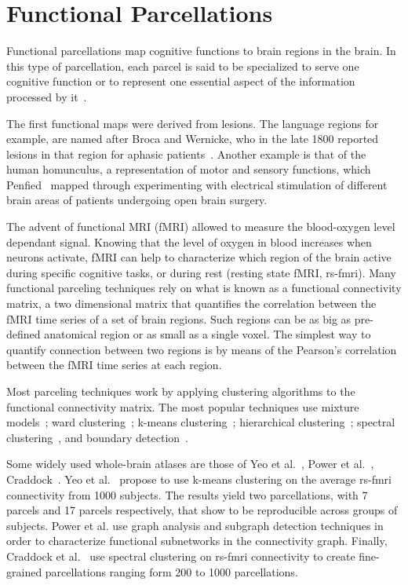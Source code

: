 \section{Functional Parcellations}
\label{sec:functional}
Functional parcellations map cognitive functions to brain regions in the brain.
In this type of parcellation, each parcel is said to be specialized to serve one
cognitive function or to represent one essential aspect of the information
processed by it~\cite{Fuster2000}.

The first functional maps were derived from lesions. The language regions for
example, are named after Broca and Wernicke, who in the late 1800 reported
lesions in that region for aphasic patients~\cite{Johns}. Another example is
that of the human homunculus, a representation of motor and sensory functions,
which Penfied~\cite{Schleicher1990} mapped through experimenting with electrical
stimulation of different brain areas of patients undergoing open brain surgery.

The advent of functional MRI (fMRI) allowed to measure the blood-oxygen level
dependant signal. Knowing that the level of oxygen in blood increases when neurons activate,
fMRI can help to characterize which region of the brain active during specific
cognitive tasks, or during rest (resting state fMRI, rs-fmri). Many functional parceling
techniques rely on what is known as a functional connectivity matrix, a two
dimensional matrix that quantifies the correlation between the fMRI time series
of a set of brain regions. Such regions can be as big as pre-defined anatomical region
or as small as a single voxel. The simplest way to quantify connection between two regions is
by means of the Pearson's correlation between the fMRI time series at each region.

Most parceling techniques work by applying clustering algorithms to the
functional connectivity matrix. The most popular techniques use 
mixture models~\cite{Lashkari2010, Ryali2012}; ward clustering~\cite{Blumensath2013};
k-means clustering~\cite{Yeo2011, Shen2013, Kahnt2012}; hierarchical clustering~\cite{Eickhoff2011, Michel2011};
spectral clustering~\cite{Thirion2006, Craddock2011, Schaefer2017}, and
boundary detection~\cite{Gordon2016, Wig2014, Schaefer2017}.

Some widely used whole-brain atlases are those of Yeo et al.~\cite{Yeo2011},
Power et al.~\cite{Power2011}, Craddock~\cite{Craddock2011}. 
Yeo et al.~\cite{Yeo2011} propose to use k-means clustering on the average
rs-fmri connectivity from 1000 subjects. The results yield two parcellations,
with 7 parcels and 17 parcels respectively, that show to be reproducible across
groups of subjects. Power et al.\cite{Power2011} use graph analysis and subgraph
detection techniques in order to characterize functional subnetworks in the
connectivity graph. Finally, Craddock et al.~\cite{Craddock2011}
use spectral clustering on rs-fmri connectivity to create fine-grained parcellations
ranging form 200 to 1000 parcellations.

